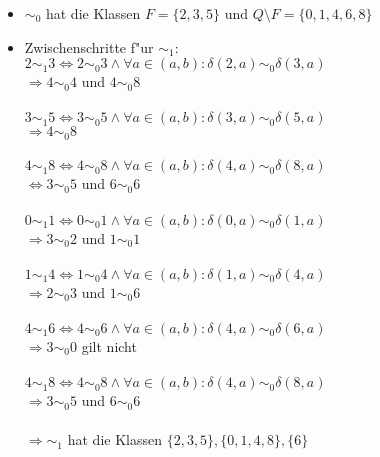 \documentclass[a4paper,12pt]{article}
\begin{document}
    \begin{itemize}
        \item $ \sim_0 $ hat die Klassen $ F = \{2, 3, 5\} $ und $ Q \setminus F = \{0, 1, 4, 6, 8\} $
        \item Zwischenschritte f"ur $ \sim_1 $: \\
        $ 2 \sim_1 3 \Leftrightarrow 2 \sim_0 3 \land \forall a \in (a, b): \delta(2, a) \sim_0 \delta(3, a) $ \\
        $ \Rightarrow 4 \sim_0 4 $ und $ 4 \sim_0 8 $ \\ \\

        $ 3 \sim_1 5 \Leftrightarrow 3 \sim_0 5 \land \forall a \in (a, b): \delta(3, a) \sim_0 \delta(5, a) $ \\
        $ \Rightarrow 4 \sim_0 8 $ \\ \\

        $ 4 \sim_1 8 \Leftrightarrow 4 \sim_0 8 \land \forall a \in (a, b): \delta(4, a) \sim_0 \delta(8, a) $ \\
        $ \Leftrightarrow 3 \sim_0 5 $ und $ 6 \sim_0 6 $ \\ \\

        $ 0 \sim_1 1 \Leftrightarrow 0 \sim_0 1 \land \forall a \in (a, b): \delta(0, a) \sim_0 \delta(1, a) $ \\
        $ \Rightarrow 3 \sim_0 2 $ und $ 1 \sim_0 1 $ \\ \\

        $ 1 \sim_1 4 \Leftrightarrow 1 \sim_0 4 \land \forall a \in (a, b): \delta(1, a) \sim_0 \delta(4, a) $ \\
        $ \Rightarrow 2 \sim_0 3 $ und $ 1 \sim_0 6 $ \\ \\

        $ 4 \sim_1 6 \Leftrightarrow 4 \sim_0 6 \land \forall a \in (a, b): \delta(4, a) \sim_0 \delta(6, a) $ \\
        $ \Rightarrow 3 \sim_0 0 $ gilt nicht \\ \\

        $ 4 \sim_1 8 \Leftrightarrow 4 \sim_0 8 \land \forall a \in (a, b): \delta(4, a) \sim_0 \delta(8, a) $ \\
        $ \Rightarrow 3 \sim_0 5 $ und  $ 6 \sim_0 6 $ \\ \\
        $ \Rightarrow \sim_1 $ hat die Klassen $ \{2, 3, 5\}, \{0, 1, 4, 8\}, \{6\} $


\end{itemize}
\end{document}
